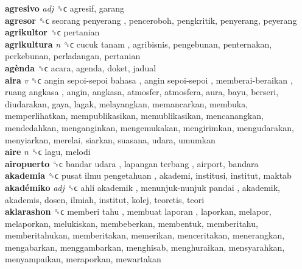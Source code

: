 \textbf{agresivo} \emph{adj}  ␝ϲ  agresif, garang  \\
\textbf{agresor} ␝ϲ   seorang penyerang , penceroboh, pengkritik, penyerang, peyerang  \\
\textbf{agrikultor} ␝ϲ  pertanian  \\
\textbf{agrikultura} \emph{n}  ␝ϲ   cucuk tanam , agribisnis, pengebunan, penternakan, perkebunan, perladangan, pertanian  \\
\textbf{agènda} ␝ϲ  acara, agenda, doket, jadual  \\
\textbf{aira} \emph{v}  ␝ϲ   angin sepoi-sepoi bahasa ,  angin sepoi-sepoi ,  memberai-beraikan ,  ruang angkasa , angin, angkasa, atmosfer, atmosfera, aura, bayu, berseri, diudarakan, gaya, lagak, melayangkan, memancarkan, membuka, memperlihatkan, mempublikasikan, memublikasikan, mencanangkan, mendedahkan, menganginkan, mengemukakan, mengirimkan, mengudarakan, menyiarkan, merelai, siarkan, suasana, udara, umumkan  \\
\textbf{aire} \emph{n}  ␝ϲ  lagu, melodi  \\
\textbf{airopuerto} ␝ϲ   bandar udara ,  lapangan terbang , airport, bandara  \\
\textbf{akademia} ␝ϲ   pusat ilmu pengetahuan , akademi, institusi, institut, maktab  \\
\textbf{akadémiko} \emph{adj}  ␝ϲ   ahli akademik ,  menunjuk-nunjuk pandai , akademik, akademis, dosen, ilmiah, institut, kolej, teoretis, teori  \\
\textbf{aklarashon} ␝ϲ   memberi tahu ,  membuat laporan , laporkan, melapor, melaporkan, melukiskan, membeberkan, membentuk, memberitahu, memberitahukan, memberitakan, memerikan, menceritakan, menerangkan, mengabarkan, menggambarkan, menghisab, menghuraikan, mensyarahkan, menyampaikan, meraporkan, mewartakan  \\
